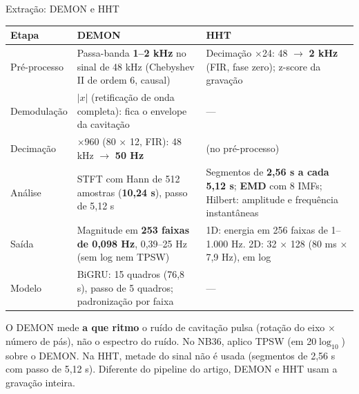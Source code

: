 \documentclass[aspectratio=169]{beamer}
\begin{document}
\begin{frame}{Extração: DEMON e HHT}
    \centering
    \scriptsize
    \renewcommand{\arraystretch}{1.1}
    \begin{tabular}{L{1.9cm}L{5.1cm}L{4.8cm}}
    \toprule
    Etapa & \textbf{DEMON} & \textbf{HHT} \\
    \midrule
    Pré-processo & Passa-banda \textbf{1--2 kHz} no sinal de 48 kHz (Chebyshev II de ordem 6, causal) & Decimação $\times$24: 48 $\to$ \textbf{2 kHz} (FIR, fase zero); z-score da gravação \\
    Demodulação & $|x|$ (retificação de onda completa): fica o envelope da cavitação & --- \\
    Decimação & $\times$960 (80 $\times$ 12, FIR): 48 kHz $\to$ \textbf{50 Hz} & (no pré-processo) \\
    Análise & STFT com Hann de 512 amostras (\textbf{10,24 s}), passo de 5,12 s & Segmentos de \textbf{2,56 s a cada 5,12 s}; \textbf{EMD} com 8 IMFs; Hilbert: amplitude e frequência instantâneas \\
    Saída & Magnitude em \textbf{253 faixas de 0,098 Hz}, 0,39--25 Hz (sem log nem TPSW) & 1D: energia em 256 faixas de 1--1.000 Hz. 2D: 32 $\times$ 128 (80 ms $\times$ 7,9 Hz), em log \\
    Modelo & BiGRU: 15 quadros (76,8 s), passo de 5 quadros; padronização por faixa & --- \\
    \bottomrule
    \end{tabular}
    \vspace{0.15cm}

    {\tiny O DEMON mede \textbf{a que ritmo} o ruído de cavitação pulsa (rotação do eixo $\times$ número de pás), não o espectro do ruído. No NB36, aplico TPSW (em 20$\log_{10}$) sobre o DEMON. Na HHT, metade do sinal não é usada (segmentos de 2,56 s com passo de 5,12 s). Diferente do pipeline do artigo, DEMON e HHT usam a gravação inteira.\par}
\end{frame}
\end{document}
